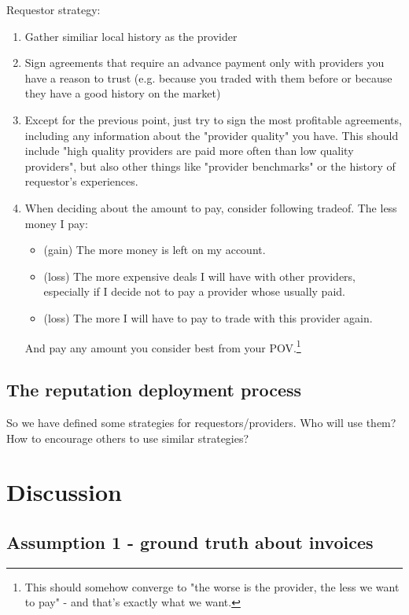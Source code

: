 \documentclass{article}
\begin{document}
Requestor strategy:
\begin{enumerate}
    \item Gather similiar local history as the provider
    \item Sign agreements that require an advance payment only with providers you have a reason to trust 
        (e.g. because you traded with them before or because they have a good history on the market)
    \item Except for the previous point, just try to sign the most profitable agreements, including any information about the "provider quality" you have.
        This should include "high quality providers are paid more often than low quality providers", but also other things like "provider benchmarks" or
        the history of requestor's experiences.
    \item When deciding about the amount to pay, consider following tradeof. The less money I pay:
        \begin{itemize}
            \item (gain) The more money is left on my account.
            \item (loss) The more expensive deals I will have with other providers, especially if I decide not to pay a provider whose usually paid.
            \item (loss) The more I will have to pay to trade with this provider again.
        \end{itemize}
        And pay any amount you consider best from your POV.\footnote{
            This should somehow converge to "the worse is the provider, the less we want to pay" - and that's exactly what we want.
        }
\end{enumerate}

\subsection{The reputation deployment process}

So we have defined some strategies for requestors/providers.
Who will use them? How to encourage others to use similar strategies?


\section{Discussion}
\subsection{Assumption 1 - ground truth about invoices}
\end{document}
